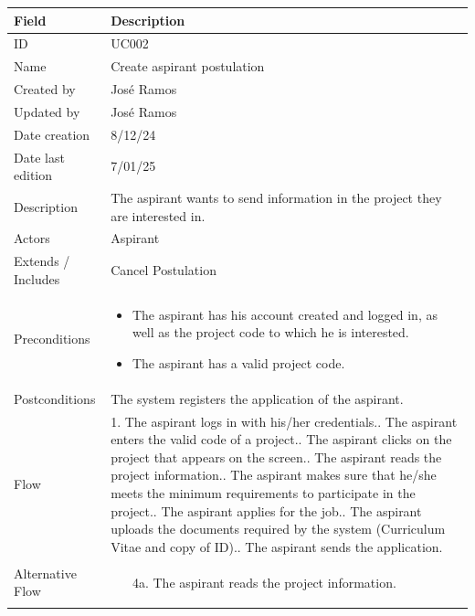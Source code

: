 \documentclass{scrreprt}
\begin{document}
\begin{table}[H]
	\centering \small
	\begin{tabular}{|p{3cm}|p{10cm}|}
		\hline
		\textbf{Field} & \textbf{Description} \\ \hline
		ID & UC002 \\ \hline
		Name & Create aspirant postulation \\ \hline
		Created by & José Ramos \\ \hline
		Updated by & José Ramos \\ \hline
		Date creation & 8/12/24 \\ \hline
		Date last edition & 7/01/25 \\ \hline
		Description & The aspirant wants to send information in the project they are interested in. \\ \hline
		Actors & Aspirant \\ \hline
		Extends / Includes & Cancel Postulation \\ \hline
		Preconditions & 
		\begin{itemize}
			\item The aspirant has his account created and logged in, as well as the project code to which he is interested.
			\item The aspirant has a valid project code.
		\end{itemize} 
		\\ \hline
		Postconditions & The system registers the application of the aspirant. \\ \hline
		Flow & 
		    1. The aspirant logs in with his/her credentials.\newline
			2. The aspirant enters the valid code of a project.\newline
			3. The aspirant clicks on the project that appears on the screen.\newline
			4. The aspirant reads the project information.\newline
			5. The aspirant makes sure that he/she meets the minimum requirements to participate in the project.\newline
			6. The aspirant applies for the job.\newline
			7. The aspirant uploads the documents required by the system (Curriculum Vitae and copy of ID).\newline
			8. The aspirant sends the application.
		\\ \hline
		Alternative Flow & 
		\begin{enumerate}
			\item[4a.] The aspirant reads the project information. 

\end{enumerate}
\end{tabular}
\end{table}
\end{document}
